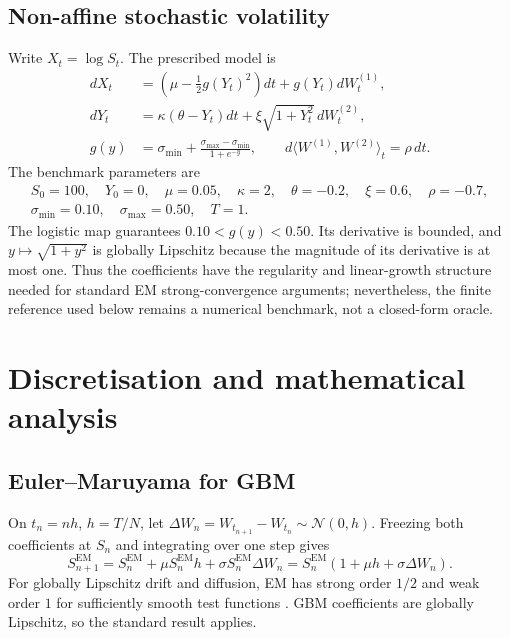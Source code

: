 \documentclass[11pt,a4paper]{article}
\theoremstyle{definition}
\theoremstyle{remark}
\begin{document}
\subsection{Non-affine stochastic volatility}
Write $X_t=\log S_t$.  The prescribed model is
\begin{align}
 dX_t &= \left(\mu-\tfrac12g(Y_t)^2\right)dt+g(Y_t)dW_t^{(1)},
 \label{eq:nonaff-x}\\
 dY_t &= \kappa(\theta-Y_t)dt+\xi\sqrt{1+Y_t^2}\,dW_t^{(2)},
 \label{eq:nonaff-y}\\
 g(y)&=\sigma_{\min}+\frac{\sigma_{\max}-\sigma_{\min}}{1+e^{-y}},
 \qquad d\langle W^{(1)},W^{(2)}\rangle_t=\rho\,dt.
 \label{eq:logistic}
\end{align}
The benchmark parameters are
\begin{equation}
\begin{gathered}
S_0=100,\quad Y_0=0,\quad \mu=0.05,\quad \kappa=2,
\quad\theta=-0.2,\quad\xi=0.6,\quad\rho=-0.7,\\
\sigma_{\min}=0.10,\quad\sigma_{\max}=0.50,\quad T=1.
\end{gathered}
\label{eq:nonaff-params}
\end{equation}
The logistic map guarantees $0.10<g(y)<0.50$.  Its derivative is bounded,
and $y\mapsto\sqrt{1+y^2}$ is globally Lipschitz because the magnitude of its
derivative is at most one.  Thus the coefficients have the regularity and
linear-growth structure needed for standard EM strong-convergence arguments;
nevertheless, the finite reference used below remains a numerical benchmark,
not a closed-form oracle.

\section{Discretisation and mathematical analysis}\label{sec:methods}

\subsection{Euler--Maruyama for GBM}
On $t_n=nh$, $h=T/N$, let $\Delta W_n=W_{t_{n+1}}-W_{t_n}\sim
\mathcal N(0,h)$.  Freezing both coefficients at $S_n$ and integrating over one
step gives
\begin{equation}
  S_{n+1}^{\mathrm{EM}}
  =S_n^{\mathrm{EM}}+\mu S_n^{\mathrm{EM}}h
   +\sigma S_n^{\mathrm{EM}}\Delta W_n
  =S_n^{\mathrm{EM}}(1+\mu h+\sigma\Delta W_n).
  \label{eq:em-gbm}
\end{equation}
For globally Lipschitz drift and diffusion, EM has strong order $1/2$ and weak
order $1$ for sufficiently smooth test functions \cite{higham2001,kloedenplaten1992}.
GBM coefficients are globally Lipschitz, so the standard result applies.
\end{document}
